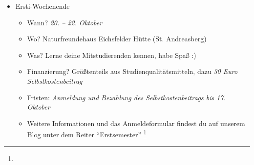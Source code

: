 \begin{itemize}
	\begin{itemize}
		\item 09:45 Uhr: 1. Große Übung Lineare Algebra (PK 2.2)
        \item nachmittags: Abfahrt Erstifahrt (Foyer Mühlenpfordstraße 23)
	\end{itemize}
	\item Ersti-Wochenende
	\begin{itemize}
		\item Wann? \emph{20. – 22. Oktober}
		\item Wo? Naturfreundehaus Eichsfelder Hütte (St. Andreasberg)
		\item Was? Lerne deine Mitstudierenden kennen, habe Spaß :)
		\item Finanzierung? Größtenteils aus Studienqualitätsmitteln, dazu \emph{30 Euro Selbstkostenbeitrag}
		\item Fristen: \emph{Anmeldung und Bezahlung des Selbstkostenbeitrags bis 17. Oktober}
		\item Weitere Informationen und das Anmeldeformular findest du auf unserem Blog unter dem Reiter \enquote{Erstsemester} \footnote{}
	\end{itemize}
\end{itemize}